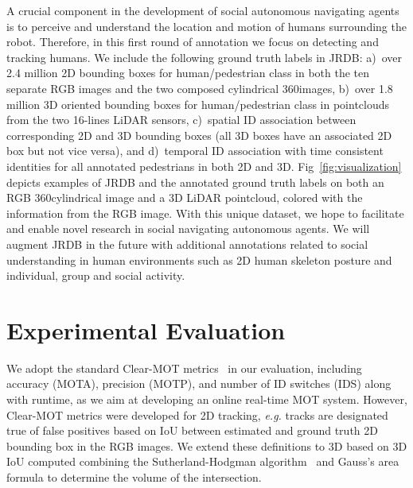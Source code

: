 \documentclass[letterpaper, 10 pt, conference]{ieeeconf}
\newcommand{\jrdb}{JRDB\xspace}
\newcommand{\eg}{\emph{e.g.}\xspace}
\begin{document}
A crucial component in the development of social autonomous navigating agents is to perceive and understand the location and motion of humans surrounding the robot. Therefore, in this first round of annotation we focus on detecting and tracking humans. We include the following ground truth labels in \jrdb: a)~over 2.4 million 2D bounding boxes for human/pedestrian class in both the ten separate RGB images and the two composed cylindrical 360\degree images, b)~over 1.8 million 3D oriented bounding boxes for human/pedestrian class in pointclouds from the two 16-lines LiDAR sensors, c)~spatial ID association between corresponding 2D and 3D bounding boxes (all 3D boxes have an associated 2D box but not vice versa), and d)~temporal ID association with time consistent identities for all annotated pedestrians in both 2D and 3D. Fig~\ref{fig:visualization} depicts examples of \jrdb and the annotated ground truth labels on both an RGB 360\degree cylindrical image and a 3D LiDAR pointcloud, colored with the information from the RGB image. With this unique dataset, we hope to facilitate and enable novel research in social navigating autonomous agents. We will augment \jrdb in the future with additional annotations related to social understanding in human environments such as 2D human skeleton posture and individual, group and social activity. \vspace{-0.025cm}
\section{Experimental Evaluation}
\label{s:exp}

We adopt the standard Clear-MOT metrics~\cite{bernardin2008evaluating} in our evaluation, including accuracy (MOTA), precision (MOTP), and number of ID switches (IDS) along with runtime, as we aim at developing an online real-time MOT system. However, Clear-MOT metrics were developed for 2D tracking, \eg tracks are designated true of false positives based on IoU between estimated and ground truth 2D bounding box in the RGB images. We extend these definitions to 3D based on 3D IoU computed combining the Sutherland-Hodgman algorithm~\cite{sutherland1974reentrant} and Gauss's area formula to determine the volume of the intersection.
\end{document}
